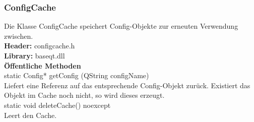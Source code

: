 \subsubsection{ConfigCache}
Die Klasse ConfigCache speichert Config-Objekte zur erneuten Verwendung zwischen.\bigskip \\
\textbf{Header:} configcache.h\bigskip \\
\textbf{Library:} baseqt.dll\bigskip \\
\textbf{Öffentliche Methoden}\\
\small{static Config* getConfig (QString configName)}\\
Liefert eine Referenz auf das entsprechende Config-Objekt zurück. Existiert das Objekt im Cache noch nicht, so wird dieses erzeugt.\bigskip \\
\small{static void deleteCache() noexcept}\\
Leert den Cache.

